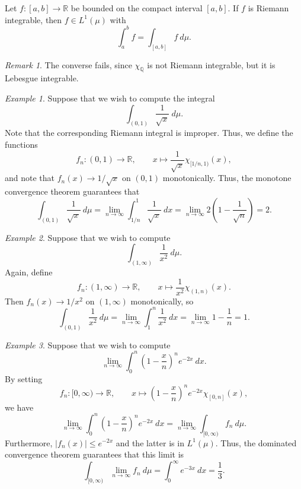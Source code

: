 \documentclass[11pt]{article}
\newcommand{\R}{\mathbb{R}}
\newcommand{\Q}{\mathbb{Q}}
\theoremstyle{definition}
\theoremstyle{remark}
\newtheorem*{remark}{Remark}
\newtheorem*{example}{Example}
\numberwithin{equation}{section}
\begin{document}
    \begin{theorem}
        Let $f\colon [a, b] \to \R$ be bounded on the compact interval $[a, b]$. If
        $f$ is Riemann integrable, then $f \in L^1(\mu)$ with \[
            \int_a^b f = \int_{[a, b]} f\:d\mu.
        \] 
        \begin{remark}
            The converse fails, since $\chi_\Q$ is not Riemann integrable, but it is
            Lebesgue integrable.
        \end{remark}
    \end{theorem}
    \begin{example}
        Suppose that we wish to compute the integral \[
            \int_{(0, 1)} \frac{1}{\sqrt{x}}\:d\mu.
        \] Note that the corresponding Riemann integral is improper. Thus, we define
        the functions \[
            f_n\colon (0, 1) \to \R, \qquad 
            x \mapsto \frac{1}{\sqrt{x}}\chi_{[1 / n, 1)}(x),
        \] and note that $f_n(x) \to 1 / \sqrt{x}$ on $(0, 1)$ monotonically.
        Thus, the monotone convergence theorem guarantees that \[
            \int_{(0, 1)} \frac{1}{\sqrt{x}}\:d\mu = \lim_{n \to \infty} \int_{1 /
            n}^1 \frac{1}{\sqrt{x}}\:dx = \lim_{n \to \infty} 2 \left( 1 -
            \frac{1}{\sqrt{n}} \right) = 2.
        \]
    \end{example}
    \begin{example}
        Suppose that we wish to compute \[
            \int_{(1, \infty)} \frac{1}{x^2}\:d\mu.
        \] Again, define \[
            f_n\colon (1, \infty) \to \R, \qquad x \mapsto \frac{1}{x^2}\chi_{(1,
            n)}(x).
        \] Then $f_n(x) \to 1 / x^2$ on $(1, \infty)$ monotonically, so \[
            \int_{(0, 1)} \frac{1}{x^2}\:d\mu = \lim_{n \to \infty} \int_1^n
            \frac{1}{x^2}\:dx = \lim_{n \to \infty} 1 - \frac{1}{n} = 1.
        \] 
    \end{example}
    \begin{example}
        Suppose that we wish to compute \[
            \lim_{n \to \infty} \int_0^n \left( 1 - \frac{x}{n} \right)^n
            e^{-2x}\:dx.
        \] By setting \[
            f_n\colon [0, \infty) \to \R, \qquad x \mapsto \left( 1 - \frac{x}{n}
            \right)^n e^{-2x}\chi_{[0, n]}(x),
        \] we have \[
            \lim_{n \to \infty} \int_0^n \left( 1 - \frac{x}{n} \right)^n
            e^{-2x}\:dx = \lim_{n \to \infty} \int_{[0, \infty)} f_n\:d\mu.
        \] Furthermore, $|f_n(x)| \leq e^{-2x}$ and the latter is in $L^1(\mu)$.
        Thus, the dominated convergence theorem guarantees that this limit is \[
            \int_{[0, \infty)} \lim_{n \to \infty} f_n\:d\mu = \int_0^\infty
            e^{-3x}\:dx = \frac{1}{3}.
        \] 
    \end{example}
\end{document}
